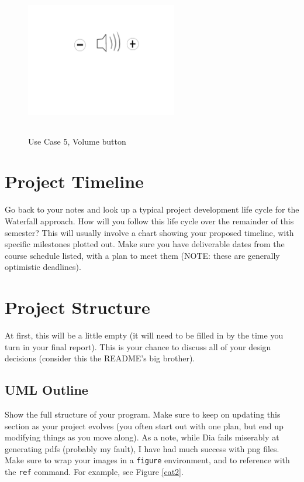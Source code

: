 \documentclass[10pt,conference,onecolumn,compsoc]{IEEEtran}
\begin{document}
\begin{figure}
\includegraphics[height=250px, width=250px]{Volume_Button_Mock_Up.jpg}
\caption{Use Case 5, Volume button}
\label{VolumeButton}
\end{figure}

\section{Project Timeline}
Go back to your notes and look up a typical project development life cycle for the Waterfall approach.  How will you follow this life cycle over the remainder of this semester?  This will usually involve a chart showing your proposed timeline, with specific milestones plotted out.  Make sure you have deliverable dates from the course schedule listed, with a plan to meet them (NOTE: these are generally optimistic deadlines).

\section{Project Structure}
At first, this will be a little empty (it will need to be filled in by the time you turn in your final report).  This is your chance to discuss all of your design decisions (consider this the README's big brother).

\subsection{UML Outline}
Show the full structure of your program.  Make sure to keep on updating this section as your project evolves (you often start out with one plan, but end up modifying things as you move along).  As a note, while Dia fails miserably at generating pdfs (probably my fault), I have had much success with png files.  Make sure to wrap your images in a \texttt{figure} environment, and to reference with the \texttt{ref} command.  For example, see Figure \ref{cat2}.
\end{document}
